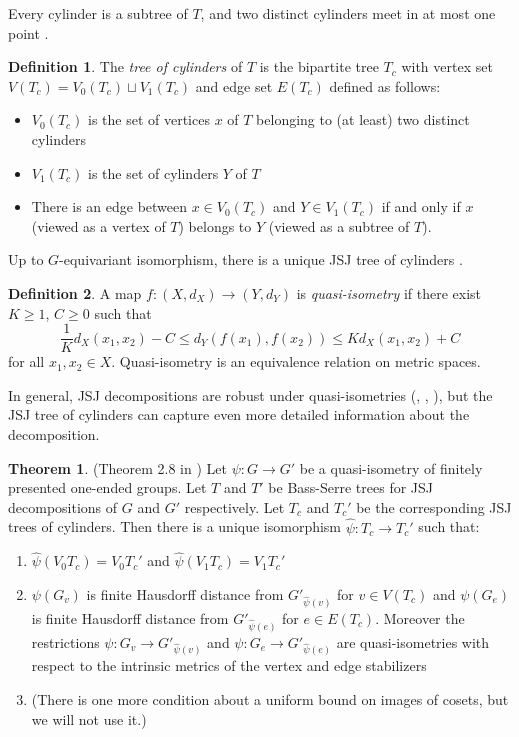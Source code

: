 \documentclass[10pt]{article}
\theoremstyle{definition}
\newtheorem{theorem}{Theorem}
\newtheorem{definition}{Definition}
\begin{document}
Every cylinder is a subtree of $T$, and two distinct cylinders meet in at most one point \cite{GLCylinder}.

\begin{definition}
The \textit{tree of cylinders} of $T$ is the bipartite tree $T_c$ with vertex
set $V(T_c) = V_0(T_c) \sqcup V_1(T_c)$ and edge set $E(T_c)$ defined as follows:
\begin{itemize}
    \item $V_0(T_c)$ is the set of vertices $x$ of $T$ belonging to (at least) two distinct cylinders
    \item $V_1(T_c)$ is the set of cylinders $Y$ of $T$
    \item There is an edge between $x\in V_0(T_c)$ and $Y\in V_1(T_c)$ if and only if $x$ (viewed as a vertex of $T$) belongs to $Y$ (viewed as a subtree of $T$). 
\end{itemize}
\end{definition}

Up to $G$-equivariant isomorphism, there is a unique JSJ tree of cylinders \cite{GLCylinder}. 

\begin{definition}\label{QI}
    A map $f:(X,d_X) \to (Y,d_Y)$ is \textit{quasi-isometry} if there exist $K\geq 1$, $C\geq 0$ such that $$\frac{1}{K} d_X(x_1,x_2) - C \leq d_Y(f(x_1),f(x_2)) \leq K d_X(x_1,x_2) + C$$
for all $x_1,x_2\in X$. Quasi-isometry is an equivalence relation on metric spaces. 
\end{definition}

In general, JSJ decompositions are robust under quasi-isometries (\cite{Papasoglu}, \cite{CashenMartin}, \cite{ShepherdWoodhouse}), but the JSJ tree of cylinders can capture even more detailed information about the  decomposition.

\begin{theorem}(Theorem 2.8 in \cite{ShepherdWoodhouse})
Let $\psi:G \to G'$ be a quasi-isometry of finitely presented one-ended groups. Let $T$ and $T'$ be Bass-Serre trees  for JSJ decompositions of $G$ and $G'$ respectively. Let $T_c$ and $T_c'$ be the corresponding JSJ trees of cylinders. Then there is a unique isomorphism $\widehat{\psi}:T_c \to T_c'$ such that:
\begin{enumerate}
    \item $\widehat{\psi}(V_0 T_c) = V_0 T_c'$ and $\widehat{\psi}(V_1 T_c) = V_1 T_c'$
    \item $\psi(G_v)$ is finite Hausdorff distance from $G'_{\widehat{\psi}(v)}$ for $v\in V(T_c)$ and $\psi(G_e)$ is finite Hausdorff distance from $G'_{\widehat{\psi}(e)}$ for $e\in E(T_c)$. Moreover the restrictions $\psi:G_v \to G'_{\widehat{\psi}(v)}$ and $\psi:G_e \to G'_{\widehat{\psi}(e)}$ are quasi-isometries with respect to the intrinsic metrics of the vertex and edge stabilizers
    \item (There is one more condition about a uniform bound on images of cosets, but we will not use it.)
\end{enumerate}
    
\end{theorem}
\end{document}
